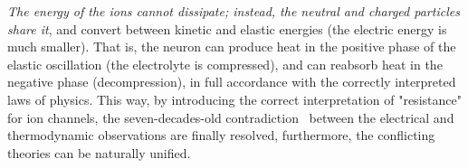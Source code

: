 \fi



\ifx\magyar\undefined
\textit{The energy of the ions cannot dissipate; instead, the neutral and charged 
particles share it}, and convert between kinetic and elastic energies (the electric energy is much smaller).
That is, the 
neuron can produce heat in the positive phase of the
elastic oscillation (the electrolyte is compressed),
and can reabsorb heat in the negative phase (decompression), in full accordance with the correctly interpreted laws of physics.
This way, by introducing the correct interpretation of "resistance" for ion channels, the seven-decades-old
contradiction~\cite{HeatProductionNeuron:1958}
between the electrical and thermodynamic observations
are finally resolved, furthermore, the conflicting theories
can be naturally unified.
\else

\fi

